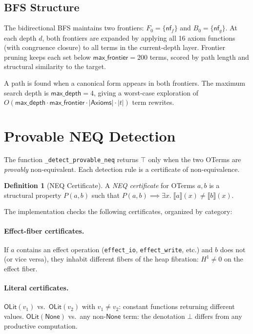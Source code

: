 \documentclass[11pt,a4paper]{report}
\theoremstyle{definition}
\newtheorem{definition}{Definition}[chapter]
\theoremstyle{plain}
\newcommand{\den}[1]{\llbracket #1 \rrbracket}
\begin{document}
\subsection{BFS Structure}

The bidirectional BFS maintains two frontiers:
$F_0 = \{\mathsf{nf}_f\}$ and $B_0 = \{\mathsf{nf}_g\}$.
At each depth $d$, both frontiers are expanded by applying all
16 axiom functions (with congruence closure) to all terms in the
current-depth layer.  Frontier pruning keeps each set below
$\mathsf{max\_frontier} = 200$ terms, scored by path length
and structural similarity to the target.

A path is found when a canonical form appears in both frontiers.
The maximum search depth is $\mathsf{max\_depth} = 4$,
giving a worst-case exploration of
$O(\mathsf{max\_depth} \cdot \mathsf{max\_frontier} \cdot
|\mathsf{Axioms}| \cdot |t|)$ term rewrites.


\section{Provable NEQ Detection}
\label{sec:neq-formal}

The function \texttt{\_detect\_provable\_neq} returns $\top$ only
when the two OTerms are \emph{provably} non-equivalent.  Each
detection rule is a certificate of non-equivalence.

\begin{definition}[NEQ Certificate]
\label{def:neq-cert}
A \emph{NEQ certificate} for OTerms $a, b$ is a structural
property $P(a, b)$ such that $P(a, b) \implies \exists x.\;
\den{a}(x) \neq \den{b}(x)$.
\end{definition}

The implementation checks the following certificates, organized
by category:

\paragraph{Effect-fiber certificates.}
If $a$ contains an effect operation (\texttt{effect\_io},
\texttt{effect\_write}, etc.) and $b$ does not (or vice versa),
they inhabit different fibers of the heap fibration:
$H^1 \neq 0$ on the effect fiber.

\paragraph{Literal certificates.}
$\mathsf{OLit}(v_1)$ vs.\ $\mathsf{OLit}(v_2)$ with $v_1 \neq v_2$:
constant functions returning different values.
$\mathsf{OLit}(\mathsf{None})$ vs.\ any non-$\mathsf{None}$ term:
the denotation $\bot$ differs from any productive computation.
\end{document}
